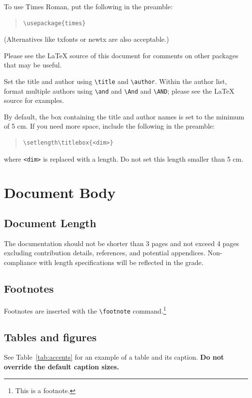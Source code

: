 \documentclass[11pt]{article}
\begin{document}
To use Times Roman, put the following in the preamble:
\begin{quote}
\begin{verbatim}
\usepackage{times}
\end{verbatim}
\end{quote}
(Alternatives like txfonts or newtx are also acceptable.)

Please see the \LaTeX{} source of this document for comments on other packages that may be useful.

Set the title and author using \verb|\title| and \verb|\author|. Within the author list, format multiple authors using \verb|\and| and \verb|\And| and \verb|\AND|; please see the \LaTeX{} source for examples.

By default, the box containing the title and author names is set to the minimum of 5 cm. If you need more space, include the following in the preamble:
\begin{quote}
\begin{verbatim}
\setlength\titlebox{<dim>}
\end{verbatim}
\end{quote}
where \verb|<dim>| is replaced with a length. Do not set this length smaller than 5 cm.

\section{Document Body}

\subsection{Document Length}
The documentation should not be shorter than 3 pages and not exceed 4 pages excluding contribution details, references, and potential appendices. Non-compliance with length specifications will be reflected in the grade.

\subsection{Footnotes}

Footnotes are inserted with the \verb|\footnote| command.\footnote{This is a footnote.}

\subsection{Tables and figures}

See Table~\ref{tab:accents} for an example of a table and its caption.
\textbf{Do not override the default caption sizes.}
\end{document}

